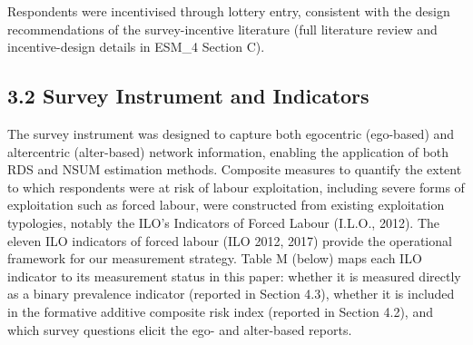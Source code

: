 \documentclass[
  12pt,
  letterpaper,
  DIV=11,
  numbers=noendperiod]{scrartcl}
\begin{document}
Respondents were incentivised through lottery entry, consistent with the
design recommendations of the survey-incentive literature (full
literature review and incentive-design details in ESM\_4 Section C).

\subsection{3.2 Survey Instrument and
Indicators}\label{survey-instrument-and-indicators}

The survey instrument was designed to capture both egocentric
(ego-based) and altercentric (alter-based) network information, enabling
the application of both RDS and NSUM estimation methods. Composite
measures to quantify the extent to which respondents were at risk of
labour exploitation, including severe forms of exploitation such as
forced labour, were constructed from existing exploitation typologies,
notably the ILO's Indicators of Forced Labour (I.L.O., 2012). The eleven
ILO indicators of forced labour (ILO 2012, 2017) provide the operational
framework for our measurement strategy. Table M (below) maps each ILO
indicator to its measurement status in this paper: whether it is
measured directly as a binary prevalence indicator (reported in Section
4.3), whether it is included in the formative additive composite risk
index (reported in Section 4.2), and which survey questions elicit the
ego- and alter-based reports.
\end{document}
